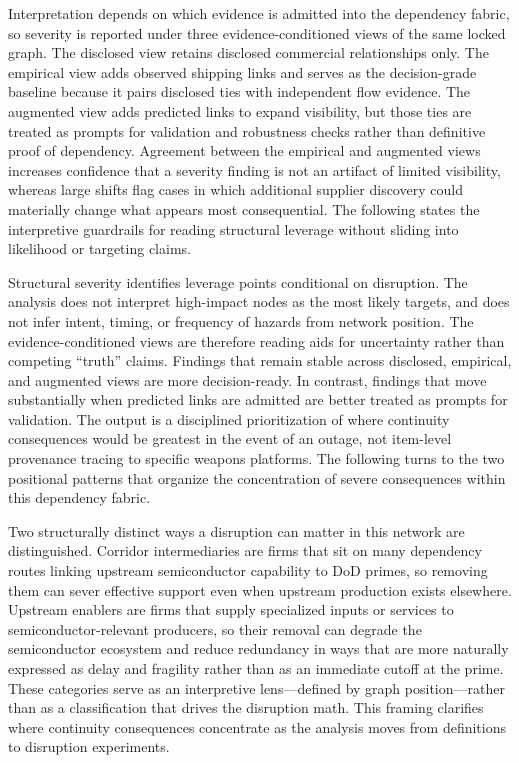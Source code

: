 Interpretation depends on which evidence is admitted into the dependency fabric, so severity is reported under three evidence-conditioned views of the same locked graph. The disclosed view retains disclosed commercial relationships only. The empirical view adds observed shipping links and serves as the decision-grade baseline because it pairs disclosed ties with independent flow evidence. The augmented view adds predicted links to expand visibility, but those ties are treated as prompts for validation and robustness checks rather than definitive proof of dependency. Agreement between the empirical and augmented views increases confidence that a severity finding is not an artifact of limited visibility, whereas large shifts flag cases in which additional supplier discovery could materially change what appears most consequential. The following states the interpretive guardrails for reading structural leverage without sliding into likelihood or targeting claims.

Structural severity identifies leverage points conditional on disruption. The analysis does not interpret high-impact nodes as the most likely targets, and does not infer intent, timing, or frequency of hazards from network position. The evidence-conditioned views are therefore reading aids for uncertainty rather than competing ``truth'' claims. Findings that remain stable across disclosed, empirical, and augmented views are more decision-ready. In contrast, findings that move substantially when predicted links are admitted are better treated as prompts for validation. The output is a disciplined prioritization of where continuity consequences would be greatest in the event of an outage, not item-level provenance tracing to specific weapons platforms. The following turns to the two positional patterns that organize the concentration of severe consequences within this dependency fabric.

Two structurally distinct ways a disruption can matter in this network are distinguished. Corridor intermediaries are firms that sit on many dependency routes linking upstream semiconductor capability to DoD primes, so removing them can sever effective support even when upstream production exists elsewhere. Upstream enablers are firms that supply specialized inputs or services to semiconductor-relevant producers, so their removal can degrade the semiconductor ecosystem and reduce redundancy in ways that are more naturally expressed as delay and fragility rather than as an immediate cutoff at the prime. These categories serve as an interpretive lens---defined by graph position---rather than as a classification that drives the disruption math. This framing clarifies where continuity consequences concentrate as the analysis moves from definitions to disruption experiments.

